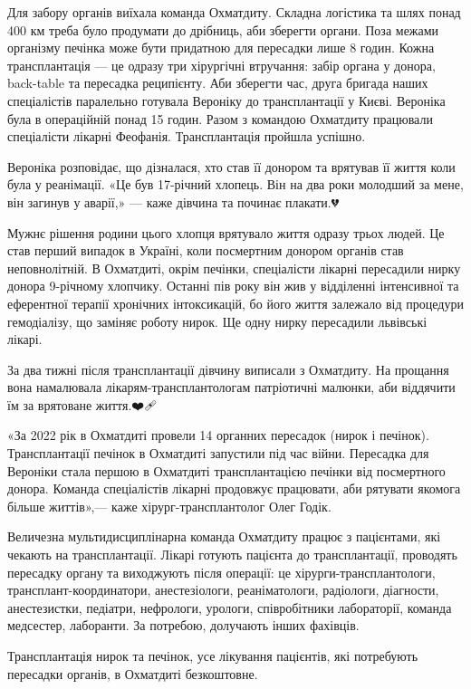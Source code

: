 Для забору органів виїхала команда Охматдиту. Складна логістика та шлях понад
400 км треба було продумати до дрібниць, аби зберегти органи. Поза межами
організму печінка може бути придатною для пересадки лише 8 годин. Кожна
трансплантація — це одразу три хірургічні втручання: забір органа у донора,
back-table та пересадка реципієнту. Аби зберегти час, друга бригада наших
спеціалістів паралельно готувала Вероніку до трансплантації у Києві. Вероніка
була в операційній понад 15 годин. Разом з командою Охматдиту працювали
спеціалісти лікарні Феофанія. Трансплантація пройшла успішно.🙌🏻

Вероніка розповідає, що дізналася, хто став її донором та врятував її життя
коли була у реанімації. «Це був 17-річний хлопець. Він на два роки молодший за
мене, він загинув у аварії,» — каже дівчина та починає плакати.💔

Мужнє рішення родини цього хлопця врятувало життя одразу трьох людей. Це став
перший випадок в Україні, коли посмертним донором органів став неповнолітній. В
Охматдиті, окрім печінки, спеціалісти лікарні пересадили нирку донора 9-річному
хлопчику. Останні пів року він жив у відділенні інтенсивної та еферентної
терапії хронічних інтоксикацій, бо його життя залежало від процедури
гемодіалізу, що заміняє роботу нирок. Ще одну нирку пересадили львівські
лікарі.🏥

За два тижні після трансплантації дівчину виписали з Охматдиту. На прощання
вона намалювала лікарям-трансплантологам патріотичні малюнки, аби віддячити їм
за врятоване життя.❤️🩹

«За 2022 рік в Охматдиті провели 14 органних пересадок (нирок і печінок).
Трансплантації печінок в Охматдиті запустили під час війни. Пересадка для
Вероніки стала першою в Охматдиті трансплантацією печінки від посмертного
донора. Команда спеціалістів лікарні продовжує працювати, аби рятувати якомога
більше життів»,— каже хірург-трансплантолог Олег Годік.💪🏻

Величезна мультидисциплінарна команда Охматдиту працює з пацієнтами, які
чекають на трансплантації. Лікарі готують пацієнта до трансплантації, проводять
пересадку органу та виходжують після операції: це хірурги-трансплантологи,
трансплант-координатори, анестезіологи, реаніматологи, радіологи, діагности,
анестезистки, педіатри, нефрологи, урологи, співробітники лабораторії, команда
медсестер, лаборанти. За потребою, долучають інших фахівців.🤝

Трансплантація нирок та печінок, усе лікування пацієнтів, які потребують
пересадки органів, в Охматдиті безкоштовне. 

